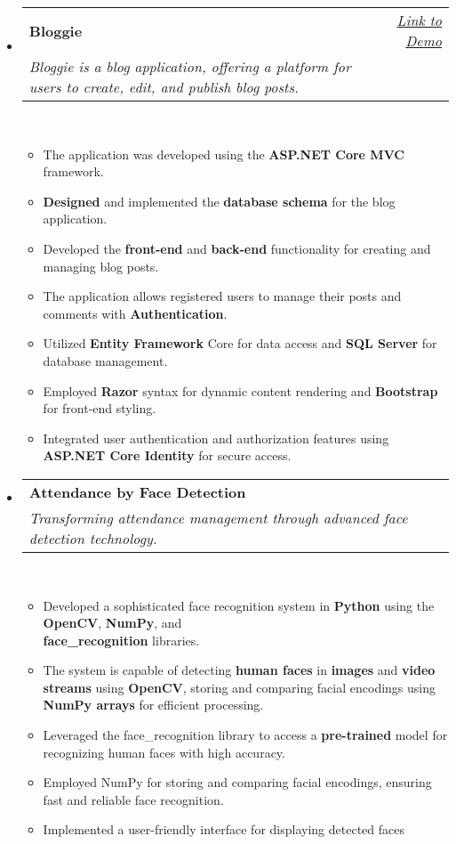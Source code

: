 \documentclass[a4paper,12pt]{article}
\makeatletter
\newcommand{\resumeSubHeadingListStart}{\begin{itemize}[leftmargin=*,labelsep=1mm,noitemsep]}
\newcommand{\resumeSubHeadingListEnd}{\end{itemize}\vspace{2mm}}
\newcommand{\resumeItemListStart}{\begin{itemize}[leftmargin=3ex, rightmargin=2ex, noitemsep,labelsep=1.2mm,itemsep=0mm]\small}
\newcommand{\resumeItemListEnd}{\end{itemize}\vspace{-2mm}}
\newcommand{\resumeExperience}[4]{
\vspace{0.5mm}\item
    \begin{tabular*}{0.98\textwidth}[t]{l@{\extracolsep{\fill}}r}
        \textbf{#1} & \textit{\footnotesize{#3}}\\
        \textit{\footnotesize{#2}} & {}
    \end{tabular*}\\ [1mm]
    \footnotesize{#4}
}
\makeatother
\begin{document}
\resumeSubHeadingListStart
\resumeExperience {Bloggie} 
{Bloggie is a blog application, offering a platform for users to create, edit, and publish blog posts.}
{\href{https://vnyseny.bsite.net/}{Link to Demo}}
{}
      \resumeItemListStart
        \item {The application was developed using the \textbf{ASP.NET Core MVC} framework.}
        \item {\textbf{Designed} and implemented the \textbf{database schema} for the blog application.}
        \item {Developed the \textbf{front-end} and \textbf{back-end} functionality for creating and managing blog posts.}
        \item {The application allows registered users to manage their posts and comments with \textbf{Authentication}.}
        \item {Utilized \textbf{Entity Framework }Core for data access and \textbf{SQL Server} for database management.}
        \item {Employed \textbf{Razor} syntax for dynamic content rendering and \textbf{Bootstrap} for front-end styling.}
        \item {Integrated user authentication and authorization features using \textbf{ASP.NET Core Identity} for secure access.}\\
    \resumeItemListEnd
\resumeExperience {Attendance by Face Detection} 
{Transforming attendance management through advanced face detection technology.}
{}
{}
      \resumeItemListStart
        \item {Developed a sophisticated face recognition system in \textbf{Python} using the \textbf{OpenCV}, \textbf{NumPy}, and \\ \textbf{face\_recognition} libraries.}
        \item {The system is capable of detecting \textbf{human faces} in \textbf{images} and \textbf{video streams} using \textbf{OpenCV}, storing and comparing facial encodings using \textbf{NumPy arrays} for efficient processing.}
        \item {Leveraged the face\_recognition library to access a \textbf{pre-trained} model for recognizing human faces with high accuracy.}
        \item {Employed NumPy for storing and comparing facial encodings, ensuring fast and reliable face recognition.}
        \item {Implemented a user-friendly interface for displaying detected faces }\\
    \resumeItemListEnd
\resumeSubHeadingListEnd



\vfill
\end{document}
